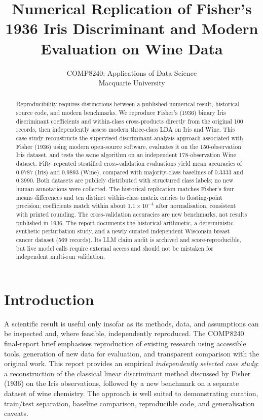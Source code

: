 \documentclass[11pt]{article}
\title{Numerical Replication of Fisher's 1936 Iris Discriminant and Modern Evaluation on Wine Data}
\author{COMP8240: Applications of Data Science\\Macquarie University}
\date{}
\begin{document}
\maketitle
\begin{abstract}
Reproducibility requires distinctions between a published numerical result, historical source code, and modern benchmarks. We reproduce Fisher's (1936) binary Iris discriminant coefficients and within-class cross-products directly from the original 100 records, then independently assess modern three-class LDA on Iris and Wine. This case study reconstructs the supervised discriminant-analysis approach associated with Fisher (1936) using modern open-source software, evaluates it on the 150-observation Iris dataset, and tests the same algorithm on an independent 178-observation Wine dataset. Fifty repeated stratified cross-validation evaluations yield mean accuracies of 0.9787 (Iris) and 0.9893 (Wine), compared with majority-class baselines of 0.3333 and 0.3990. Both datasets are publicly distributed with structured class labels; no new human annotations were collected. The historical replication matches Fisher's four means differences and ten distinct within-class matrix entries to floating-point precision; coefficients match within about $1.1\times 10^{-4}$ after normalisation, consistent with printed rounding. The cross-validation accuracies are new benchmarks, not results published in 1936. The report documents the historical arithmetic, a deterministic synthetic perturbation study, and a newly curated independent Wisconsin breast cancer dataset (569 records). Its LLM claim audit is archived and score-reproducible, but live model calls require external access and should not be mistaken for independent multi-run validation.
\end{abstract}
\section{Introduction}
A scientific result is useful only insofar as its methods, data, and assumptions can be inspected and, where feasible, independently reproduced. The COMP8240 final-report brief emphasises reproduction of existing research using accessible tools, generation of new data for evaluation, and transparent comparison with the original work. This report provides an empirical \emph{independently selected case study}: a reconstruction of the classical linear discriminant method discussed by Fisher (1936) on the Iris observations, followed by a new benchmark on a separate dataset of wine chemistry. The approach is well suited to demonstrating curation, train/test separation, baseline comparison, reproducible code, and generalisation caveats.
\end{document}
